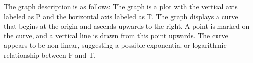 The graph description is as follows: The graph is a plot with the vertical axis labeled as P and the horizontal axis labeled as T. The graph displays a curve that begins at the origin and ascends upwards to the right. A point is marked on the curve, and a vertical line is drawn from this point upwards. The curve appears to be non-linear, suggesting a possible exponential or logarithmic relationship between P and T.